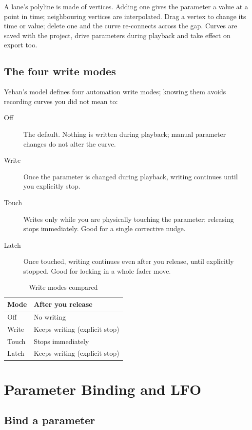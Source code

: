 A lane's polyline is made of vertices. Adding one gives the parameter a value at a
point in time; neighbouring vertices are interpolated. Drag a vertex to change its
time or value; delete one and the curve re-connects across the gap. Curves are saved
with the project, drive parameters during playback and take effect on export too.

\subsection{The four write modes}

Yeban's model defines four automation write modes; knowing them avoids recording
curves you did not mean to:

\begin{description}
  \item[Off] The default. Nothing is written during playback; manual parameter changes do not alter the curve.
  \item[Write] Once the parameter is changed during playback, writing continues until you explicitly stop.
  \item[Touch] Writes only while you are physically touching the parameter; releasing stops immediately. Good for a single corrective nudge.
  \item[Latch] Once touched, writing continues even after you release, until explicitly stopped. Good for locking in a whole fader move.
\end{description}

\begin{table}[htbp]
\centering
\caption{Write modes compared}
\label{tab:ch06-write-modes}
\begin{tabular}{ll}
\hline
Mode & After you release \\
\hline
Off & No writing \\
Write & Keeps writing (explicit stop) \\
Touch & Stops immediately \\
Latch & Keeps writing (explicit stop) \\
\hline
\end{tabular}
\end{table}

\section{Parameter Binding and LFO}

\subsection{Bind a parameter}


